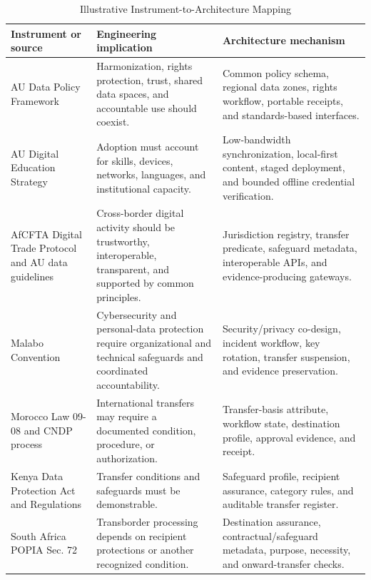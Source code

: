 \documentclass[journal]{IEEEtran}
\newcommand{\THead}[1]{\cellcolor{TableHeader}\textbf{#1}}
\begin{document}
\begin{table}[t]
\caption{Illustrative Instrument-to-Architecture Mapping}
\label{tab:legalmap}
\centering
\scriptsize
\begin{tabularx}{\textwidth}{|p{}|p{}|Y|}
\hline
\THead{Instrument or source} & \THead{Engineering implication} & \THead{Architecture mechanism} \\
\hline
AU Data Policy Framework \cite{audatapolicy} & Harmonization, rights protection, trust, shared data spaces, and accountable use should coexist. & Common policy schema, regional data zones, rights workflow, portable receipts, and standards-based interfaces. \\
\hline
AU Digital Education Strategy \cite{audigitaleducation} & Adoption must account for skills, devices, networks, languages, and institutional capacity. & Low-bandwidth synchronization, local-first content, staged deployment, and bounded offline credential verification. \\
\hline
AfCFTA Digital Trade Protocol and AU data guidelines \cite{AfCFTADigitalTrade2024,audigitaltradeguidelines} & Cross-border digital activity should be trustworthy, interoperable, transparent, and supported by common principles. & Jurisdiction registry, transfer predicate, safeguard metadata, interoperable APIs, and evidence-producing gateways. \\
\hline
Malabo Convention \cite{malaboconvention} & Cybersecurity and personal-data protection require organizational and technical safeguards and coordinated accountability. & Security/privacy co-design, incident workflow, key rotation, transfer suspension, and evidence preservation. \\
\hline
Morocco Law 09-08 and CNDP process \cite{moroccolaw0908,cndptransfer} & International transfers may require a documented condition, procedure, or authorization. & Transfer-basis attribute, workflow state, destination profile, approval evidence, and receipt. \\
\hline
Kenya Data Protection Act and Regulations \cite{kenyadpa,kenyaregulations} & Transfer conditions and safeguards must be demonstrable. & Safeguard profile, recipient assurance, category rules, and auditable transfer register. \\
\hline
South Africa POPIA Sec. 72 \cite{popia} & Transborder processing depends on recipient protections or another recognized condition. & Destination assurance, contractual/safeguard metadata, purpose, necessity, and onward-transfer checks. \\

\end{tabularx}
\end{table}
\end{document}
